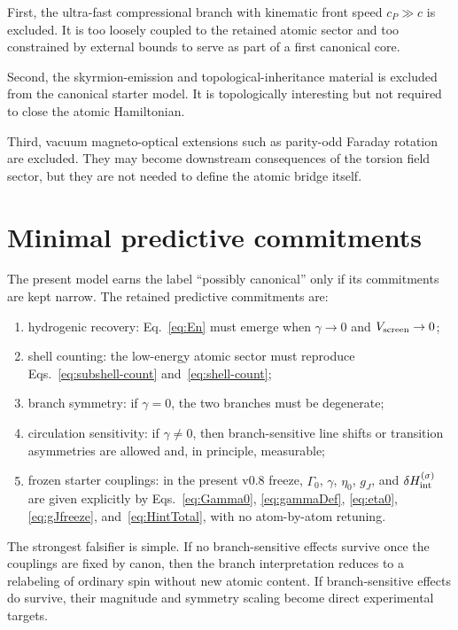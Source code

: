 \documentclass[11pt,a4paper]{article}
\begin{document}
First, the ultra-fast compressional branch with kinematic front speed $c_P\gg c$ is excluded. It is too loosely coupled to the retained atomic sector and too constrained by external bounds to serve as part of a first canonical core.

Second, the skyrmion-emission and topological-inheritance material is excluded from the canonical starter model. It is topologically interesting but not required to close the atomic Hamiltonian.

Third, vacuum magneto-optical extensions such as parity-odd Faraday rotation are excluded. They may become downstream consequences of the torsion field sector, but they are not needed to define the atomic bridge itself.

\section{Minimal predictive commitments}
The present model earns the label ``possibly canonical'' only if its commitments are kept narrow. The retained predictive commitments are:
\begin{enumerate}[label=(P\arabic*)]
    \item hydrogenic recovery: Eq.~\eqref{eq:En} must emerge when $\gamma\to 0$ and $V_{\rm screen}\to 0$;
    \item shell counting: the low-energy atomic sector must reproduce Eqs.~\eqref{eq:subshell-count} and~\eqref{eq:shell-count};
    \item branch symmetry: if $\gamma=0$, the two branches must be degenerate;
    \item circulation sensitivity: if $\gamma\neq 0$, then branch-sensitive line shifts or transition asymmetries are allowed and, in principle, measurable;
    \item frozen starter couplings: in the present v0.8 freeze, $\Gamma_0$, $\gamma$, $\eta_0$, $g_J$, and $\delta H_{\rm int}^{(\sigma)}$ are given explicitly by Eqs.~\eqref{eq:Gamma0}, \eqref{eq:gammaDef}, \eqref{eq:eta0}, \eqref{eq:gJfreeze}, and~\eqref{eq:HintTotal}, with no atom-by-atom retuning.
\end{enumerate}

The strongest falsifier is simple. If no branch-sensitive effects survive once the couplings are fixed by canon, then the branch interpretation reduces to a relabeling of ordinary spin without new atomic content. If branch-sensitive effects do survive, their magnitude and symmetry scaling become direct experimental targets.
\end{document}
